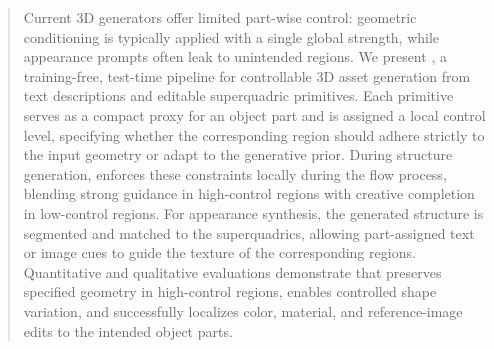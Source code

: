 \begin{abstract}
Current 3D generators offer limited part-wise control: geometric conditioning is typically applied with a single global strength, while appearance prompts often leak to unintended regions. We present \textbf{\methodname}, a training-free, test-time pipeline for controllable 3D asset generation from text descriptions and editable superquadric primitives. Each primitive serves as a compact proxy for an object part and is assigned a local control level, specifying whether the corresponding region should adhere strictly to the input geometry or adapt to the generative prior. During structure generation, \methodname enforces these constraints locally during the flow process, blending strong guidance in high-control regions with creative completion in low-control regions. For appearance synthesis, the generated structure is segmented and matched to the superquadrics, allowing part-assigned text or image cues to guide the texture of the corresponding regions. Quantitative and qualitative evaluations demonstrate that \methodname preserves specified geometry in high-control regions, enables controlled shape variation, and successfully localizes color, material, and reference-image edits to the intended object parts. 
\end{abstract}